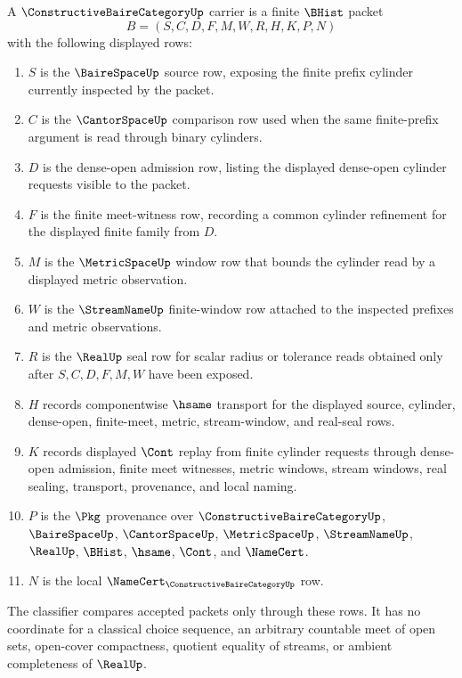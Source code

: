 \begin{definition}
\label{def:constructive-baire-category-carrier}
A $\ConstructiveBaireCategoryUp$ carrier is a finite $\BHist$ packet
$$
B=(S,C,D,F,M,W,R,H,K,P,N)
$$
with the following displayed rows:
\begin{enumerate}
\item $S$ is the $\BaireSpaceUp$ source row, exposing the finite prefix cylinder currently inspected by the packet.
\item $C$ is the $\CantorSpaceUp$ comparison row used when the same finite-prefix argument is read through binary cylinders.
\item $D$ is the dense-open admission row, listing the displayed dense-open cylinder requests visible to the packet.
\item $F$ is the finite meet-witness row, recording a common cylinder refinement for the displayed finite family from $D$.
\item $M$ is the $\MetricSpaceUp$ window row that bounds the cylinder read by a displayed metric observation.
\item $W$ is the $\StreamNameUp$ finite-window row attached to the inspected prefixes and metric observations.
\item $R$ is the $\RealUp$ seal row for scalar radius or tolerance reads obtained only after $S,C,D,F,M,W$ have been exposed.
\item $H$ records componentwise $\hsame$ transport for the displayed source, cylinder, dense-open, finite-meet, metric, stream-window, and real-seal rows.
\item $K$ records displayed $\Cont$ replay from finite cylinder requests through dense-open admission, finite meet witnesses, metric windows, stream windows, real sealing, transport, provenance, and local naming.
\item $P$ is the $\Pkg$ provenance over $\ConstructiveBaireCategoryUp$, $\BaireSpaceUp$, $\CantorSpaceUp$, $\MetricSpaceUp$, $\StreamNameUp$, $\RealUp$, $\BHist$, $\hsame$, $\Cont$, and $\NameCert$.
\item $N$ is the local $\NameCert_{\ConstructiveBaireCategoryUp}$ row.
\end{enumerate}
The classifier compares accepted packets only through these rows. It has no coordinate for a classical choice sequence, an arbitrary countable meet of open sets, open-cover compactness, quotient equality of streams, or ambient completeness of $\RealUp$.
\end{definition}

